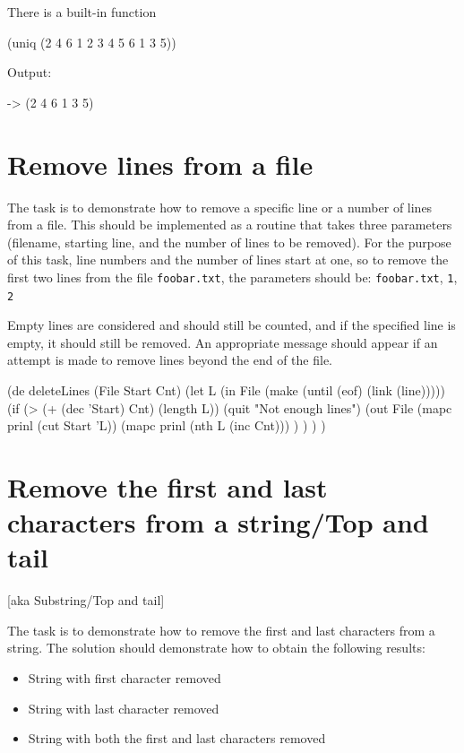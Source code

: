 \begin{wideverbatim}

There is a built-in function

(uniq (2 4 6 1 2 3 4 5 6 1 3 5))

Output:

-> (2 4 6 1 3 5)

\end{wideverbatim}

\pagebreak{}
\section*{Remove lines from a file}

The task is to demonstrate how to remove a specific line or a number of
lines from a file. This should be implemented as a routine that takes
three parameters (filename, starting line, and the number of lines to be
removed). For the purpose of this task, line numbers and the number of
lines start at one, so to remove the first two lines from the file
\texttt{foobar.txt}, the parameters should be: \texttt{foobar.txt},
\texttt{1}, \texttt{2}

Empty lines are considered and should still be counted, and if the
specified line is empty, it should still be removed. An appropriate
message should appear if an attempt is made to remove lines beyond the
end of the file.

\begin{wideverbatim}

(de deleteLines (File Start Cnt)
   (let L (in File (make (until (eof) (link (line)))))
      (if (> (+ (dec 'Start) Cnt) (length L))
         (quit "Not enough lines")
         (out File
            (mapc prinl (cut Start 'L))
            (mapc prinl (nth L (inc Cnt))) ) ) ) )

\end{wideverbatim}

\pagebreak{}
\section*{Remove the first and last characters from a string/Top and tail}
[aka Substring/Top and tail]

The task is to demonstrate how to remove the first and last characters
from a string. The solution should demonstrate how to obtain the
following results:

\begin{itemize}
\item
  String with first character removed
\item
  String with last character removed
\item
  String with both the first and last characters removed
\end{itemize}

